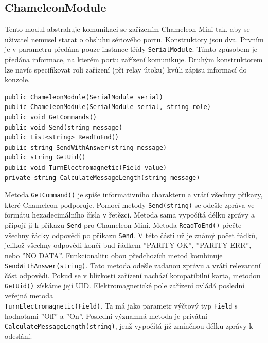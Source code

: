 \subsection*{ChameleonModule}
Tento modul abstrahuje komunikaci se zařízením Chameleon Mini tak, aby se uživatel nemusel starat o obsluhu sériového portu. Konstruktory jsou dva. Prvním je v parametru předána pouze instance třídy \verb|SerialModule|. Tímto způsobem je předána informace, na kterém portu zařízení komunikuje. Druhým konstruktorem lze navíc specifikovat roli zařízení (při relay útoku) kvůli zápisu informací do konzole.

\begin{lstlisting}[caption=Metody třídy \emph{ChameleonModule}, label={chameleonModuleMethods}]
public ChameleonModule(SerialModule serial)
public ChameleonModule(SerialModule serial, string role)
public void GetCommands()
public void Send(string message)
public List<string> ReadToEnd()
public string SendWithAnswer(string message)
public string GetUid()
public void TurnElectromagnetic(Field value)
private string CalculateMessageLength(string message)
\end{lstlisting}

Metoda \verb|GetCommand()| je spíše informativního charakteru a vrátí všechny příkazy, které Chameleon podporuje. Pomocí metody \verb|Send(string)| se odešle zpráva ve formátu hexadecimálního čísla v řetězci. Metoda sama vypočítá délku zprávy a připojí ji k příkazu \verb|Send| pro Chameleon Mini. Metoda \verb|ReadToEnd()| přečte všechny řádky odpovědi po příkazu \verb|Send|. V této části už je známý počet řádků, jelikož všechny odpovědi končí buď řádkem ''PARITY OK'', ''PARITY ERR'', nebo ''NO DATA''. Funkcionalitu obou předchozích metod kombinuje \verb|SendWithAnswer(string)|. Tato metoda odešle zadanou zprávu a vrátí relevantní část odpovědi. Pokud se v blízkosti zařízení nachází kompatibilní karta, metodou \verb|GetUid()| získáme její UID. Elektromagnetické pole zařízení ovládá poslední veřejná metoda \\\verb|TurnElectromagnetic(Field)|. Ta má jako parametr výčtový typ \verb|Field| s hodnotami ''Off'' a ''On''. Poslední významná metoda je privátní \verb|CalculateMessageLength(string)|, jenž vypočítá již zmíněnou délku zprávy k odeslání. 

